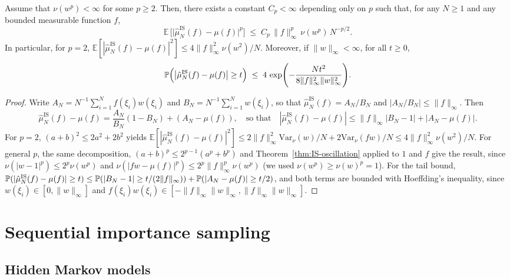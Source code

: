 \documentclass[english,graybox,envcountchap,envcountsame,sectrefs,shortlabels]{svmono}
\theoremstyle{style}
\newcommand{\eqsp}{}
\begin{document}
\begin{theorem}\label{thm:IS-non-asymptotic}
Assume that $\nu(w^p) < \infty$ for some
$p \ge 2$. Then, there exists a constant $C_p<\infty$ depending only on $p$ such that, for any $N \ge 1$
and any bounded measurable function $f$,
\begin{equation}\label{eq:IS-moment-bound}
\mathbb{E}\,\bigl[\bigl|\hat{\mu}^{\mathrm{IS}}_{N}(f) - \mu(f)\bigr|^p\bigr]
\;\le\; C_p\, \|f\|_\infty^p\,\nu(w^p)\,N^{-p/2}\eqsp.
\end{equation}
In particular, for $p=2$, $\mathbb{E}[|\hat{\mu}^{\mathrm{IS}}_{N}(f) - \mu(f)|^2]\leq 4\|f\|_\infty^2\nu(w^2)/N$. Moreover, if $\|w\|_\infty<\infty$, for all $t\ge 0$,
\begin{equation}\label{eq:IS-tail-bound}
\mathbb{P}\Bigl(
\bigl|\hat{\mu}^{\mathrm{IS}}_{N}(f) - \mu(f)\bigr| \ge t
\Bigr)
\;\le\; 4 \,\exp\Biggl(
-\frac{N t^2}{8\|f\|_{\infty}^2\|w\|_\infty^2}
\Biggr)\eqsp.
\end{equation}
\end{theorem}
\begin{proof}
Write $A_N = N^{-1}\sum_{i=1}^N f(\xi_i)w(\xi_i)$ and $B_N = N^{-1}\sum_{i=1}^N w(\xi_i)$, so that $\hat\mu^{\mathrm{IS}}_N(f) = A_N/B_N$ and $|A_N/B_N|\leq\|f\|_\infty$. Then
$$
\hat\mu^{\mathrm{IS}}_N(f)-\mu(f) = \frac{A_N}{B_N}(1-B_N) + (A_N-\mu(f))\eqsp,\quad\mbox{so that}\quad |\hat\mu^{\mathrm{IS}}_N(f)-\mu(f)|\leq\|f\|_\infty|B_N-1|+|A_N-\mu(f)|\eqsp.
$$
For $p=2$, $(a+b)^2\leq2a^2+2b^2$ yields $\mathbb{E}[|\hat\mu^{\mathrm{IS}}_N(f)-\mu(f)|^2]\leq 2\|f\|^2_\infty\mathrm{Var}_\nu(w)/N + 2\mathrm{Var}_\nu(fw)/N\leq4\|f\|_\infty^2\nu(w^2)/N$. For general $p$, the same decomposition, $(a+b)^p\leq2^{p-1}(a^p+b^p)$ and Theorem~\ref{thm:IS-oscillation} applied to $1$ and $f$ give the result, since $\nu(|w-1|^p)\leq 2^p\nu(w^p)$ and $\nu(|fw-\mu(f)|^p)\leq 2^p\|f\|_\infty^p\nu(w^p)$ (we used $\nu(w^p)\geq\nu(w)^p = 1$). For the tail bound, $\mathbb{P}(|\hat\mu^{\mathrm{IS}}_N(f)-\mu(f)|\geq t)\leq\mathbb{P}(|B_N-1|\geq t/(2\|f\|_\infty))+\mathbb{P}(|A_N-\mu(f)|\geq t/2)$, and both terms are bounded with Hoeffding's inequality, since $w(\xi_i)\in[0,\|w\|_\infty]$ and $f(\xi_i)w(\xi_i)\in[-\|f\|_\infty\|w\|_\infty,\|f\|_\infty\|w\|_\infty]$.
\end{proof}

\section{Sequential importance sampling}

\subsection{Hidden Markov models}
\label{sec:hmm}
\end{document}
